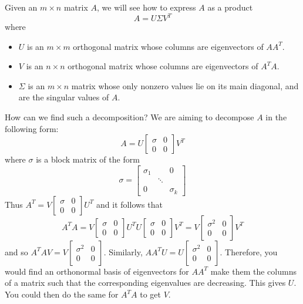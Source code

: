 \documentclass{ximera}
\begin{document}
Given an $m\times n$ matrix $A$, we will see how to express $A$ as a product
\[ A=U\Sigma V^T\]
where
\begin{itemize}
\item $U$ is an $m\times m$ orthogonal matrix whose columns are
eigenvectors of $AA^T$.
\item $V$ is an $n\times n$ orthogonal matrix whose columns are
eigenvectors of $A^TA$.
\item $\Sigma$ is an $m\times n$ matrix whose only nonzero values
lie on its main diagonal, and are the singular values of $A$.
\end{itemize}
How can we find such a decomposition? We are aiming to decompose $A$ in the following form:
\begin{equation*}
A=U\left[
\begin{array}{cc}
\sigma & 0 \\
0 & 0
\end{array}
\right] V^T
\end{equation*}
where $\sigma $ is a block matrix of the form
\[
\sigma =\left[
\begin{array}{ccc}
\sigma _{1} &  & 0 \\
& \ddots &  \\
0 &  & \sigma _{k}
\end{array}
\right]
\]
Thus $A^T=V\left[
\begin{array}{cc}
\sigma & 0 \\
0 & 0
\end{array}
\right] U^T$ and it follows that
\begin{equation*}
A^TA=V\left[
\begin{array}{cc}
\sigma & 0 \\
0 & 0
\end{array}
\right] U^TU\left[
\begin{array}{cc}
\sigma & 0 \\
0 & 0
\end{array}
\right] V^T=V\left[
\begin{array}{cc}
\sigma ^{2} & 0 \\
0 & 0
\end{array}
\right] V^T
\end{equation*}
and so $A^TAV=V\left[
\begin{array}{cc}
\sigma ^{2} & 0 \\
0 & 0
\end{array}
\right] .$ Similarly, $AA^TU=U\left[
\begin{array}{cc}
\sigma ^{2} & 0 \\
0 & 0
\end{array}
\right] .$ Therefore, you would find an orthonormal basis of eigenvectors
for $AA^T$ make them the columns of a matrix such that the
corresponding eigenvalues are decreasing. This gives $U.$ You could then do
the same for $A^TA$ to get $V$.
 
\end{document}
